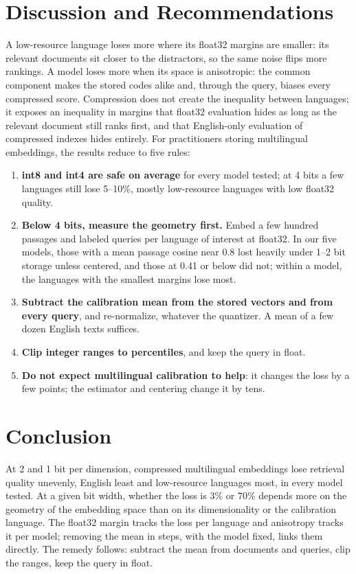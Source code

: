 \documentclass[11pt]{article}
\begin{document}
\section{Discussion and Recommendations}\label{sec:reco}
A low-resource language loses more where its float32 margins are smaller: its relevant documents sit closer to the distractors, so the same noise flips more rankings. A model loses more when its space is anisotropic: the common component makes the stored codes alike and, through the query, biases every compressed score. Compression does not create the inequality between languages; it exposes an inequality in margins that float32 evaluation hides as long as the relevant document still ranks first, and that English-only evaluation of compressed indexes hides entirely. For practitioners storing multilingual embeddings, the results reduce to five rules:
\begin{enumerate}[nosep,leftmargin=*]
\item \textbf{int8 and int4 are safe on average} for every model tested; at 4 bits a few languages still lose 5--10\%, mostly low-resource languages with low float32 quality.
\item \textbf{Below 4 bits, measure the geometry first.} Embed a few hundred passages and labeled queries per language of interest at float32. In our five models, those with a mean passage cosine near 0.8 lost heavily under 1--2 bit storage unless centered, and those at 0.41 or below did not; within a model, the languages with the smallest margins lose most.
\item \textbf{Subtract the calibration mean from the stored vectors and from every query}, and re-normalize, whatever the quantizer. A mean of a few dozen English texts suffices.
\item \textbf{Clip integer ranges to percentiles}, and keep the query in float.
\item \textbf{Do not expect multilingual calibration to help}: it changes the loss by a few points; the estimator and centering change it by tens.
\end{enumerate}

\section{Conclusion}
At 2 and 1 bit per dimension, compressed multilingual embeddings lose retrieval quality unevenly, English least and low-resource languages most, in every model tested. At a given bit width, whether the loss is 3\% or 70\% depends more on the geometry of the embedding space than on its dimensionality or the calibration language. The float32 margin tracks the loss per language and anisotropy tracks it per model; removing the mean in steps, with the model fixed, links them directly. The remedy follows: subtract the mean from documents and queries, clip the ranges, keep the query in float.
\end{document}
